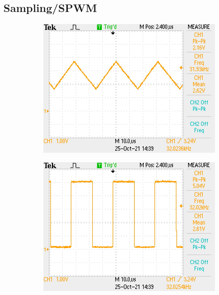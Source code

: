 \documentclass[11pt]{article}
\begin{document}
{\subsection*{Sampling/SPWM}
\begin{figure}[h!]
  \centering
  \begin{subfigure}{0.3\textwidth}
    \includegraphics[width=\columnwidth]{img/testing/spwm/triangle_wave_32kHz.JPG}
  \end{subfigure}
  \begin{subfigure}{0.3\textwidth}
    \includegraphics[width=\columnwidth]{img/testing/spwm/spwm_no_input.JPG}
  \end{subfigure}\\

\end{figure}}
\end{document}
